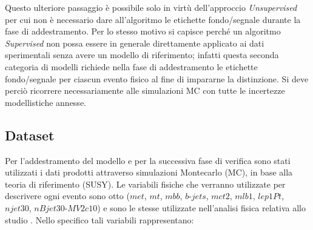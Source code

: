 Questo ulteriore passaggio è possibile solo in virtù dell'approccio \textit{Unsupervised} per cui non è necessario dare all'algoritmo le etichette fondo/segnale durante la fase di addestramento. Per lo stesso motivo si capisce perché un algoritmo \textit{Supervised} non possa essere in generale direttamente applicato ai dati sperimentali senza avere un modello di riferimento; infatti questa seconda categoria di modelli richiede nella fase di addestramento le etichette fondo/segnale per ciascun evento fisico al fine di impararne la distinzione. Si deve perciò ricorrere necessariamente alle simulazioni MC con tutte le incertezze modellistiche annesse. 


\newpage


\subsection{Dataset}
\label{dataset}
Per l'addestramento del modello e per la successiva fase di verifica sono stati utilizzati i dati prodotti attraverso simulazioni Montecarlo (MC), in base alla teoria di riferimento (SUSY). Le variabili fisiche che verranno utilizzate per descrivere ogni evento sono otto ($\textit{met}$, $\textit{mt}$, $\textit{mbb}$, $\textit{b-jets}$, $\textit{mct2}$, $\textit{mlb1}$, $\textit{lep1Pt}$, $\textit{njet30}$, $\textit{nBjet30-MV2c10}$) e sono le stesse utilizzate nell'analisi fisica relativa allo studio \cite{susy_alberto}. Nello specifico tali variabili rappresentano:
